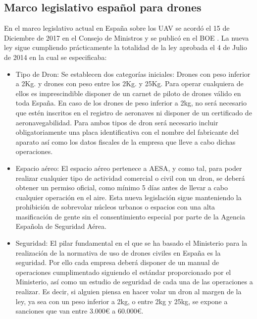 \subsection{Marco legislativo español para drones}
\hspace{1cm} En el marco legislativo actual en España sobre los UAV se acordó el 15 de Diciembre de 2017 en el Consejo de Ministros y se publicó en el BOE \cite{BOE}. La nueva ley sigue cumpliendo prácticamente la totalidad de la ley aprobada el 4 de Julio de 2014 en la cual se especificaba: 
\begin{itemize}
		\item Tipo de Dron: Se establecen dos categorías iniciales: Drones con peso inferior a 2Kg. y drones con peso entre los 2Kg. y 25Kg. Para operar cualquiera de ellos es imprescindible disponer de un carnet de piloto de drones válido en toda España. En caso de los drones de peso inferior a 2kg, no será necesario que estén inscritos en el registro de aeronaves ni disponer de un certificado de aeronavegabilidad. Para ambos tipos de dron será necesario incluir obligatoriamente una placa identificativa con el nombre del fabricante del aparato así como los datos fiscales de la empresa que lleve a cabo dichas operaciones.
		\item Espacio aéreo: El espacio aéreo pertenece a AESA, y como tal, para poder realizar cualquier tipo de actividad comercial o civil con un dron, se deberá obtener un permiso oficial, como mínimo 5 días antes de llevar a cabo cualquier operación en el aire. Esta nueva legislación sigue manteniendo la prohibición de sobrevolar núcleos urbanos o espacios con una alta masificación de gente sin el consentimiento especial por parte de la Agencia Española de Seguridad Aérea.
		\item Seguridad: El pilar fundamental en el que se ha basado el Ministerio para la realización de la normativa de uso de drones civiles en España es la seguridad. Por ello cada empresa deberá disponer de un manual de operaciones cumplimentado siguiendo el estándar proporcionado por el Ministerio, así como un estudio de seguridad de cada una de las operaciones a realizar. Es decir, si alguien piensa en hacer volar un dron al margen de la ley, ya sea con un peso inferior a 2kg, o entre 2kg y 25kg, se expone a sanciones que van entre 3.000\textup{\euro} a 60.000\textup{\euro}.

\end{itemize}
